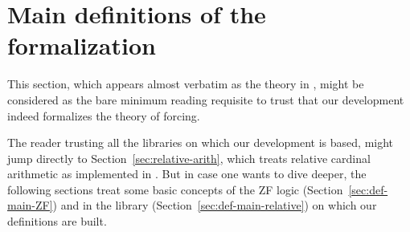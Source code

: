 \section{Main definitions of the formalization}\label{sec:definitions_main}

This section, which appears almost verbatim as
the theory  in \cite{Independence_CH-AFP},
might be considered as the bare minimum reading requisite to
trust that our development indeed formalizes the theory of
forcing.

The reader trusting
all the libraries on which our development is based, might jump
directly to Section~\ref{sec:relative-arith}, which treats relative
cardinal arithmetic as implemented in
. But in case one wants to dive deeper, the
following sections treat some basic concepts of the ZF logic
(Section~\ref{sec:def-main-ZF}) and in the
 library (Section~\ref{sec:def-main-relative})
on which our definitions are built.

